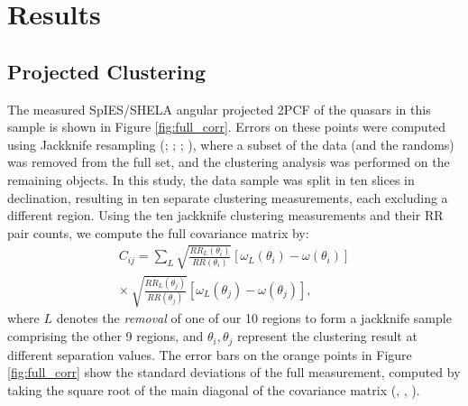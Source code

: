 \documentclass[apj, numberedappendix]{emulateapj}
\begin{document}
\section{Results}\label{sec:4}

\subsection{Projected Clustering}

The measured SpIES/SHELA angular projected 2PCF of the quasars in this sample is shown in Figure \ref{fig:full_corr}. Errors on these points were computed using Jackknife resampling (\citealt{Scranton2002}; \citealt{Myers2007}; \citealt{Ross2009}; \citealt{Eft2015}), where a subset of the data (and the randoms) was removed from the full set, and the clustering analysis was performed on the remaining objects. In this study, the data sample was split in ten slices in declination, resulting in ten separate clustering measurements, each excluding a different region. Using the ten jackknife clustering measurements and their RR pair counts, we compute the full covariance matrix by:
\begin{equation}
\begin{aligned}
C_{ij} = \sum_{L} \sqrt{\frac{RR_L(\theta_i)}{RR(\theta_i)}}[\omega_L(\theta_i) - \omega(\theta_i)]  \\ 
\times\ \sqrt{\frac{RR_L(\theta_j)}{RR(\theta_j)}}[\omega_L(\theta_j) - \omega(\theta_j)],
\end{aligned}\label{eqn:covariance}
\end{equation}
where $L$ denotes the {\em removal} of one of our 10 regions to form a jackknife sample comprising the other 9 regions, and $\theta_i, \theta_j$ represent the clustering result at different separation values. The error bars on the orange points in Figure \ref{fig:full_corr} show the standard deviations of the full measurement, computed by taking the square root of the main diagonal of the covariance matrix (\citealt{Myers2007}, \citealt{Ross2009}, \citealt{Eft2015}). 
\end{document}
